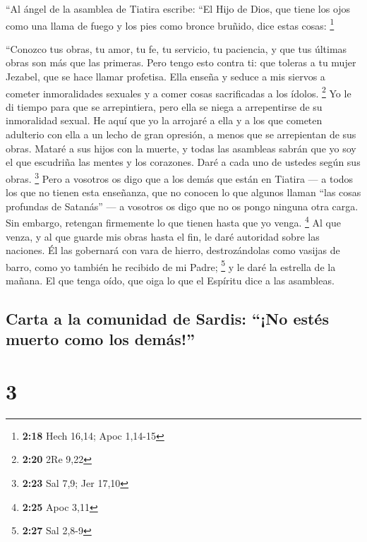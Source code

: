  ``Al ángel de la asamblea de Tiatira escribe: ``El Hijo
de Dios, que tiene los ojos como una llama de fuego y los pies como
bronce bruñido, dice estas cosas: \footnote{\textbf{2:18} Hech 16,14;
  Apoc 1,14-15}

 ``Conozco tus obras, tu amor, tu fe, tu servicio, tu
paciencia, y que tus últimas obras son más que las primeras.
 Pero tengo esto contra ti: que toleras a tu mujer
Jezabel, que se hace llamar profetisa. Ella enseña y seduce a mis
siervos a cometer inmoralidades sexuales y a comer cosas sacrificadas a
los ídolos. \footnote{\textbf{2:20} 2Re 9,22}  Yo le di
tiempo para que se arrepintiera, pero ella se niega a arrepentirse de su
inmoralidad sexual.  He aquí que yo la arrojaré a ella y
a los que cometen adulterio con ella a un lecho de gran opresión, a
menos que se arrepientan de sus obras.  Mataré a sus
hijos con la muerte, y todas las asambleas sabrán que yo soy el que
escudriña las mentes y los corazones. Daré a cada uno de ustedes según
sus obras. \footnote{\textbf{2:23} Sal 7,9; Jer 17,10} 
Pero a vosotros os digo que a los demás que están en Tiatira --- a todos
los que no tienen esta enseñanza, que no conocen lo que algunos llaman
``las cosas profundas de Satanás'' --- a vosotros os digo que no os
pongo ninguna otra carga.  Sin embargo, retengan
firmemente lo que tienen hasta que yo venga. \footnote{\textbf{2:25}
  Apoc 3,11}  Al que venza, y al que guarde mis obras
hasta el fin, le daré autoridad sobre las naciones.  Él
las gobernará con vara de hierro, destrozándolas como vasijas de barro,
como yo también he recibido de mi Padre; \footnote{\textbf{2:27} Sal
  2,8-9}  y le daré la estrella de la mañana.
 El que tenga oído, que oiga lo que el Espíritu dice a
las asambleas.

\hypertarget{carta-a-la-comunidad-de-sardis-no-estuxe9s-muerto-como-los-demuxe1s}{%
\subsection{Carta a la comunidad de Sardis: ``¡No estés muerto como los
demás!''}\label{carta-a-la-comunidad-de-sardis-no-estuxe9s-muerto-como-los-demuxe1s}}

\hypertarget{section-2}{%
\section{3}\label{section-2}}

